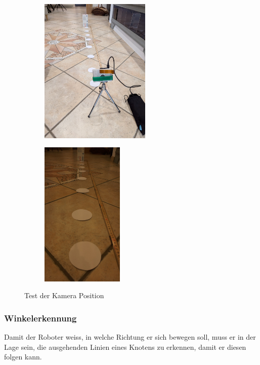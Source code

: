 \begin{figure}[H]
\centering
\begin{subfigure}{0.45\textwidth}
\centering
    \includegraphics[height=7cm]{assets/informatik-prototyp/camera/camera_position_prototype_at_home.jpg}
\end{subfigure}
\begin{subfigure}{0.45\textwidth}
\centering
    \includegraphics[height=7cm]{assets/informatik-prototyp/camera/camera_position_prototype.jpg}
\end{subfigure}
\caption{Test der Kamera Position}
\label{fig:camera-position-prototype}
\end{figure}


\subsubsection*{Winkelerkennung}\label{winkelerkennung}

Damit der Roboter weiss, in welche Richtung er sich bewegen soll, muss er in der Lage sein, die ausgehenden Linien eines Knotens zu erkennen, damit er diesen folgen kann.

